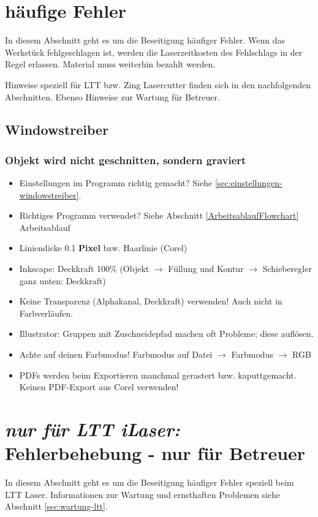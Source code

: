 \documentclass{\basedir/fablab-document}
\newcommand{\nurLTT}{\emph{nur für LTT iLaser:} }
\begin{document}
	\section{häufige Fehler}
	\label{sec:fehler-allgemein}
	In diesem Abschnitt geht es um die Beseitigung häufiger Fehler. Wenn das Werkstück fehlgeschlagen ist, werden die Laserzeitkosten des Fehlschlags in der Regel erlassen. Material muss weiterhin bezahlt werden.

	Hinweise speziell für LTT bzw. Zing Lasercutter finden sich in den nachfolgenden Abschnitten. Ebenso Hinweise zur Wartung für Betreuer.

	\subsection{Windowstreiber}
	\subsubsection{Objekt wird nicht geschnitten, sondern graviert}
	\begin{itemize}
		\item Einstellungen im Programm richtig gemacht? Siehe \cref{sec:einstellungen-windowstreiber}.
		\item Richtiges Programm verwendet? Siehe Abschnitt \ref{ArbeitsablaufFlowchart} Arbeitsablauf
		\item Liniendicke 0.1 \textbf{Pixel} bzw. Haarlinie (Corel)
		\item Inkscape: Deckkraft 100\% (Objekt $\rightarrow$ Füllung und Kontur $\rightarrow$ Schieberegler ganz unten: Deckkraft)
		\item Keine Transparenz (Alphakanal, Deckkraft) verwenden! Auch nicht in Farbverläufen.
		\item Illustrator: Gruppen mit Zuschneidepfad machen oft Probleme; diese auflösen.
		\item Achte auf deinen Farbmodus! Farbmodus auf Datei $\rightarrow$ Farbmodus $\rightarrow$ RGB
		\item PDFs werden beim Exportieren manchmal gerastert bzw. kaputtgemacht. Keinen PDF-Export aus Corel verwenden!
	\end{itemize}

	\section{\nurLTT Fehlerbehebung - nur für Betreuer}
	In diesem Abschnitt geht es um die Beseitigung häufiger Fehler speziell beim LTT Laser.
	Informationen zur Wartung und ernsthaften Problemen siehe Abschnitt \ref{sec:wartung-ltt}.
\end{document}
